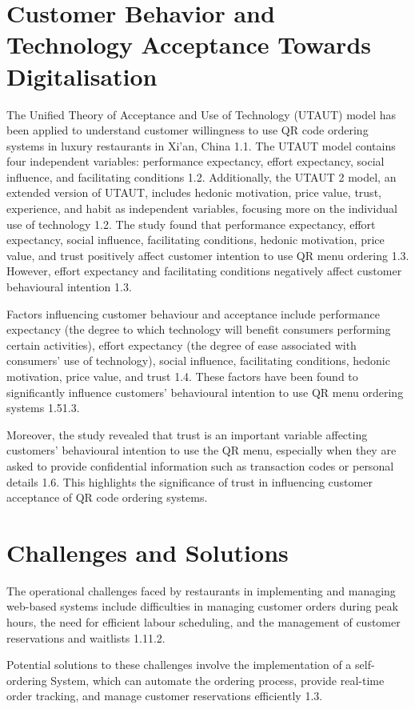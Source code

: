\section{Customer Behavior and Technology Acceptance Towards Digitalisation}
The Unified Theory of Acceptance and Use of Technology (UTAUT) model has been applied to understand customer willingness to use QR code ordering systems in luxury restaurants in Xi'an, China 1.1. The UTAUT model contains four independent variables: performance expectancy, effort expectancy, social influence, and facilitating conditions 1.2. Additionally, the UTAUT 2 model, an extended version of UTAUT, includes hedonic motivation, price value, trust, experience, and habit as independent variables, focusing more on the individual use of technology 1.2. The study found that performance expectancy, effort expectancy, social influence, facilitating conditions, hedonic motivation, price value, and trust positively affect customer intention to use QR menu ordering 1.3. However, effort expectancy and facilitating conditions negatively affect customer behavioural intention 1.3.

Factors influencing customer behaviour and acceptance include performance expectancy (the degree to which technology will benefit consumers performing certain activities), effort expectancy (the degree of ease associated with consumers' use of technology), social influence, facilitating conditions, hedonic motivation, price value, and trust 1.4. These factors have been found to significantly influence customers' behavioural intention to use QR menu ordering systems 1.51.3.

Moreover, the study revealed that trust is an important variable affecting customers' behavioural intention to use the QR menu, especially when they are asked to provide confidential information such as transaction codes or personal details 1.6. This highlights the significance of trust in influencing customer acceptance of QR code ordering systems.

\section{Challenges and Solutions}
The operational challenges faced by restaurants in implementing and managing web-based systems include difficulties in managing customer orders during peak hours, the need for efficient labour scheduling, and the management of customer reservations and waitlists 1.11.2. 

Potential solutions to these challenges involve the implementation of a self-ordering System, which can automate the ordering process, provide real-time order tracking, and manage customer reservations efficiently 1.3.


